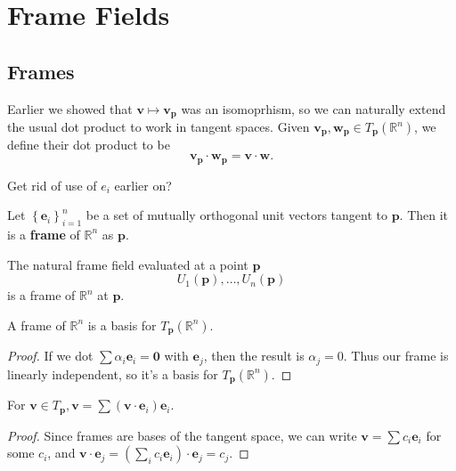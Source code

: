 \documentclass[10pt]{report}
\begin{document}

\chapter{Frame Fields}


\section{Frames}

Earlier we showed that $\mathbf{v}\mapsto \mathbf{v}_{\mathbf{p}} $ was an isomoprhism, so we can naturally extend the usual dot product to work in tangent spaces. Given $\mathbf{v}_{\mathbf{p}}, \mathbf{w}_{\mathbf{p}} \in T_{\mathbf{p}}(\mathbb{R}^n)$, we define their dot product to be
\[
\mathbf{v}_{\mathbf{p}}\cdot \mathbf{w}_{\mathbf{p}} = \mathbf{v} \cdot \mathbf{w}.
\] 

{\color{red}Get rid of use of $e_i$ earlier on?}

\begin{defn}[]
Let $\left\{ \mathbf{e}_i \right\}_{i=1}^n$ be a set of mutually orthogonal unit vectors tangent to $\mathbf{p}$. Then it is a \textbf{frame} of $\mathbb{R}^n$ as $\mathbf{p}$.
\end{defn}

\begin{ex}[]
	The natural frame field evaluated at a point $\mathbf{p}$ 
	\[
		U_1(\mathbf{p}), \dots, U_n(\mathbf{p})
	\] is a frame of $\mathbb{R}^n$ at $\mathbf{p}$.
\end{ex}

\begin{lem}
	A frame of $\mathbb{R}^n$ is a basis for $T_{\mathbf{p}}(\mathbb{R}^n)$.
\end{lem}
\begin{proof}
	If we dot $\sum \alpha_i \mathbf{e}_i =\mathbf{0}$ with $\mathbf{e}_j$, then the result is $\alpha_j=0$. Thus our frame is linearly independent, so it's a basis for $T_{\mathbf{p}}(\mathbb{R}^n)$.
\end{proof}

\begin{thrm}[]
	For $\mathbf{v} \in T_{\mathbf{p}}, $$\mathbf{v} = \sum (\mathbf{v}\cdot \mathbf{e}_i)\mathbf{e}_i$.
\end{thrm}
\begin{proof}
	Since frames are bases of the tangent space, we can write $\mathbf{v} = \sum c_i \mathbf{e}_i$ for some $c_i$, and $\mathbf{v}\cdot \mathbf{e}_j = (\sum_i c_i \mathbf{e}_i)\cdot \mathbf{e}_j = c_j$.
\end{proof}
\end{document}
